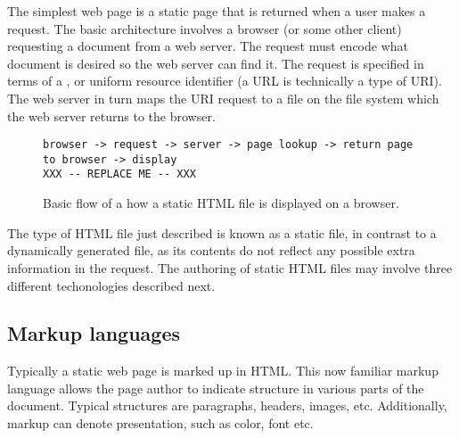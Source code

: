 



The simplest web page is a static page that is returned when a user
makes a request. The basic architecture involves a browser (or some
other client) requesting a document from a web server. The request
must encode what document is desired so the web server can find
it. The request is specified in terms of a , or uniform
resource identifier (a URL is technically a type
of URI). The web server in turn maps the URI request to a file on the
file system which the web server returns to the browser.

\begin{figure}
  \centering
\begin{verbatim}
browser -> request -> server -> page lookup -> return page to browser -> display
XXX -- REPLACE ME -- XXX
\end{verbatim}
  \caption{Basic flow of a how a static HTML file is displayed on a browser.}
  \label{fig:static-html-file}
\end{figure}


The type of HTML file just described is known as a static file, in contrast to a
dynamically generated file, as its contents do not reflect any
possible extra information in the request. The authoring of static HTML files
may involve three different techonologies described next.


\subsection{Markup languages}
\label{sec:markup-languages}

Typically a static web page is marked up in HTML. This now familiar
markup language allows the page author to indicate structure in
various parts of the document. Typical structures are paragraphs,
headers, images, etc. Additionally, markup can denote presentation, such
as color, font etc.

